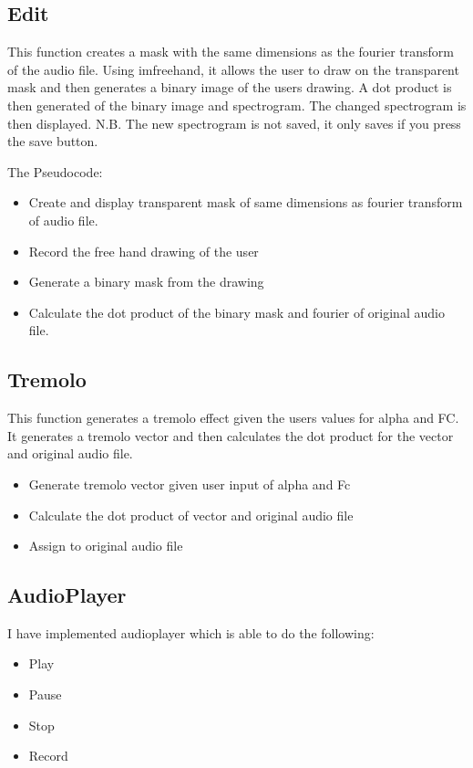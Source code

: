 \documentclass[12pt]{article}
\begin{document}
			\subsection{Edit}

				This function creates a mask with the same dimensions as the fourier transform of the audio file. Using imfreehand, it allows the user to draw on the transparent mask and then generates a binary image of the users drawing. A dot product is then generated of the binary image and spectrogram. The changed spectrogram is then displayed. N.B. The new spectrogram is not saved, it only saves if you press the save button.\newline

				The Pseudocode:

				\begin{itemize}
					\item Create and display transparent mask of same dimensions as fourier transform of audio file.
					\item Record the free hand drawing of the user
					\item Generate a binary mask from the drawing
					\item Calculate the dot product of the binary mask and fourier of original audio file.
				\end{itemize}

			\subsection{Tremolo}

				This function generates a tremolo effect given the users values for alpha and FC. It generates a tremolo vector and then calculates the dot product for the vector and original audio file. 

				\begin{itemize}
					\item Generate tremolo vector given user input of alpha and Fc
					\item Calculate the dot product of vector and original audio file
					\item Assign to original audio file
				\end{itemize}

			\subsection{AudioPlayer}
		
				I have implemented audioplayer which is able to do the following: 
				\begin{itemize}
					\item Play 
					\item Pause
					\item Stop
					\item Record
				\end{itemize}
\end{document}
